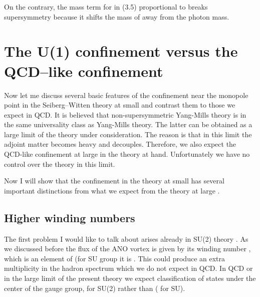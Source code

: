 \documentclass[a4paper,12pt]{article}
\begin{document}
On the contrary, the mass term for \coordHE{} in (3.5) proportional to \coordHE{}
breaks \coordHE{} supersymmetry because it shifts the mass of \coordHE{}
away from the photon mass.


\section{The U(1) confinement versus the QCD--like
confinement}
\setcounter{equation}{0}

Now let me discuss several basic features of the confinement near
the monopole point in the Seiberg--Witten theory 
at small \myHighlight{$\mu$}\coordHE{} and contrast
them to those we expect in QCD. It is believed that non-supersymmetric
Yang-Mills theory  is in the same universality class as \coordHE{}
Yang-Mills theory. The latter can be obtained as 
a large \myHighlight{$\mu $}\coordHE{} limit of the theory under consideration.
The reason is that in this limit the adjoint matter
 becomes heavy and decouples.
 Therefore, we  also expect the QCD-like
confinement at large \myHighlight{$\mu$}\coordHE{} in the theory at hand.
Unfortunately we have no control over the theory in this limit.

 Now I will
show that the \coordHE{} confinement in the theory at small \myHighlight{$\mu$}\coordHE{}
has several important distinctions from what we expect from the theory
at large \myHighlight{$\mu$}\coordHE{}. 

\subsection{Higher winding numbers}

The first problem I would like to talk about arises already in
SU(2) theory \cite{S}. As we discussed before the
flux of the ANO vortex is given by its winding number \coordHE{}, which
is an element of \coordHE{} (for SU\coordHE{} group it is
\coordHE{}. This could produce an extra
multiplicity in the hadron spectrum which we do not expect in
QCD. In QCD or in the large \myHighlight{$\mu$}\coordHE{} limit of the present theory we
expect classification of states under the center of the gauge
group, \coordHE{} for SU(2) rather than \coordHE{} (\coordHE{} for
SU\coordHE{}).
\end{document}
